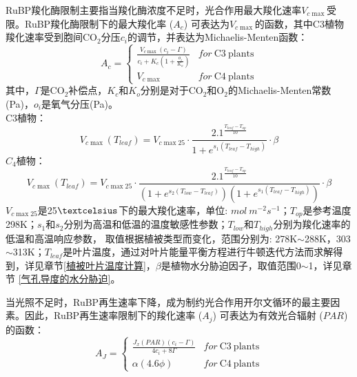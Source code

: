 RuBP羧化酶限制主要指当羧化酶浓度不足时，光合作用最大羧化速率$V_{c \max }$受限。RuBP羧化酶限制下的最大羧化率 ($A_c$) 可表达为$V_{c \max }$的函数，其中C3植物羧化速率受到胞间CO$_2$分压$c_i$的调节，并表达为Michaelis-Menten函数：
\begin{equation}\label{A_C1}
A_{c}=\left\{\begin{array}{ll}\frac{V_{c \max }\left(c_{i}-\Gamma\right)}{c_{i}+K_{c}\left(1+\frac{o_{i}}{K_{o}}\right)}
     & { for\ } \mathrm{ C3\ } \mathrm{ plants } \\ V_{c \max } & { for\ } \mathrm{ C4\ } \mathrm{ plants }\end{array}\right.
\end{equation}
其中，$\Gamma$是CO$_2$补偿点，$K_c$和$K_o$分别是对于CO$_2$和O$_2$的Michaelis-Menten常数(Pa)，$o_i$是氧气分压(Pa)。\\
C3植物：\\
\begin{equation}\label{V_cmax_a}
V_{c \max }\left(T_{{leaf }}\right)=V_{c \max 25} \cdot \frac{2.1^{\frac{T_{{leaf }}-T_{o p}}{10}}}{1+e^{s_{1}\left(T_{{leaf }}-T_{{high }}\right)}} \cdot \beta
\end{equation}
$C_4$植物：\\
\begin{equation}\label{V_cmax_b}
V_{c \max }\left(T_{{leaf }}\right)=V_{c \max 25} \cdot \frac{2.1^{\frac{T_{{leaf }}-T_{o p}}{10}}}{\left(1+e^{s_{2}\left(T_{{low }}
 - T_{{leaf }}\right)}\right)\left(1+e^{s_{1}\left(T_{{leaf }}-T_{h i g h}\right)}\right)} \cdot \beta
\end{equation}
$V_{c \max 25}$是25$\textcelsius$下的最大羧化速率，单位: $mol \mathrm{ }\ m^{-2}s^{-1}$；$T_{op}$是参考温度298K；$s_1$和$s_2$分别为高温和低温的温度敏感性参数；$T_{low}$和$T_{high}$分别为羧化速率的低温和高温响应参数，
取值根据植被类型而变化，范围分别为: 278K$\sim$288K，303$\sim$313K；$T_{leaf}$是叶片温度，通过对叶片能量平衡方程进行牛顿迭代方法而求解得到，详见章节\ref{植被叶片温度计算}，$\beta$是植物水分胁迫因子，取值范围0$\sim$1，详见章节 \ref{气孔导度的水分胁迫}。

当光照不足时，RuBP再生速率下降，成为制约光合作用开尔文循环的最主要因素。因此，RuBP再生速率限制下的羧化速率 ($A_j$) 可表达为有效光合辐射 ($PAR$) 的函数：
\begin{equation}\label{A_J1}
A_{J}=\left\{\begin{array}{ll}\frac{J_x\left(PAR\right)\left(c_{i}-\Gamma\right)}{4c_{i}+8\Gamma}
     & { for\ } \mathrm{ C3\ } \mathrm{ plants } \\ \alpha\left(4.6\phi\right) & { for\ } \mathrm{ C4\ } \mathrm{ plants }\end{array}\right.
\end{equation}

